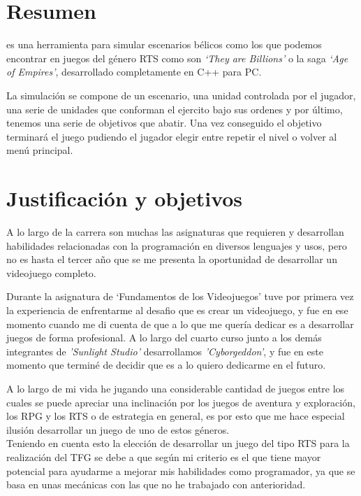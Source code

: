 \chapter*{Resumen}
\label{Resumen}
 es una herramienta para simular escenarios 
bélicos como los que podemos encontrar en juegos del género \ac{RTS} como son
\textit{`They are Billions'} o la saga \textit{`Age of Empires'}, desarrollado
completamente en C++ para \ac{PC}.

La simulación se compone de un escenario, una unidad controlada por el jugador,
una serie de unidades que conforman el ejercito bajo sus ordenes y por último, 
tenemos una serie de objetivos que abatir. Una vez conseguido el objetivo terminará
el juego pudiendo el jugador elegir entre repetir el nivel o volver al menú principal.

\chapter*{Justificación y objetivos}
A lo largo de la carrera son muchas las asignaturas que requieren y desarrollan
habilidades relacionadas con la programación en diversos lenguajes y usos, 
pero no es hasta el tercer año que se me presenta la oportunidad de desarrollar
un videojuego completo. 

Durante la asignatura de `Fundamentos de los Videojuegos' tuve por primera vez
la experiencia de enfrentarme al desafio que es crear un videojuego, y fue en ese
momento cuando me di cuenta de que a lo que me quería dedicar es a
desarrollar juegos de forma profesional. A lo largo del cuarto curso junto a los demás
integrantes de \textit{'Sunlight Studio'} desarrollamos \textit{'Cyborgeddon'}, y fue
en este momento que terminé de decidir que es a lo quiero dedicarme en el futuro.

A lo largo de mi vida he jugando una considerable cantidad de juegos entre los cuales
se puede apreciar una inclinación por los juegos de aventura y exploración, los 
\ac{RPG} y los \ac{RTS} o de estrategia en general, es por esto que me hace especial
ilusión desarrollar un juego de uno de estos géneros.\\
Teniendo en cuenta esto la elección de desarrollar un juego del tipo \ac{RTS} para la
realización del \ac{TFG} se debe a que según mi criterio es el que tiene mayor
potencial para ayudarme a mejorar mis habilidades como programador, ya que se basa en
unas mecánicas con las que no he trabajado con anterioridad.

